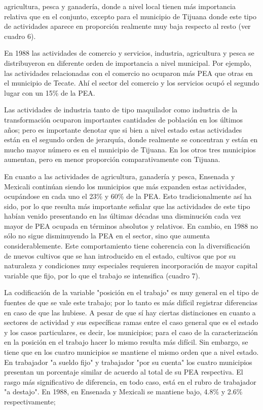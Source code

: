 \documentclass{article}
\begin{document}
agricultura, pesca y ganadería, donde a nivel local tienen más importancia relativa que en el conjunto, excepto para el municipio de Tijuana donde este tipo de actividades aparece en proporción realmente muy baja respecto al resto (ver cuadro 6).

En 1988 las actividades de comercio y servicios, industria, agricultura y pesca se distribuyeron en diferente orden de importancia a nivel municipal. Por ejemplo, las actividades relacionadas con el comercio no ocuparon más PEA que otras en el municipio de Tecate. Ahí el sector del comercio y los servicios ocupó el segundo lugar con un 15\% de la PEA.

Las actividades de industria tanto de tipo maquilador como industria de la transformación ocuparon importantes cantidades de población en los últimos años; pero es importante denotar que si bien a nivel estado estas actividades están en el segundo orden de jerarquía, donde realmente se concentran y están en mucho mayor número es en el municipio de Tijuana. En los otros tres municipios aumentan, pero en menor proporción comparativamente con Tijuana.

En cuanto a las actividades de agricultura, ganadería y pesca, Ensenada y Mexicali continúan siendo los municipios que más expanden estas actividades, ocupándose en cada uno el 23\% y 60\% de la PEA. Esto tradicionalmente así ha sido, por lo que resulta más importante sefialar que las actividades de este tipo habían venido presentando en las últimas décadas una disminución cada vez mayor de PEA ocupada en términos absolutos y relativos. En cambio, en 1988 no sólo no sigue disminuyendo la PEA en el sector, sino que aumenta considerablemente. Este comportamiento tiene coherencia con la diversificación de nuevos cultivos que se han introducido en el estado, cultivos que por su naturaleza y condiciones muy especiales requieren incorporación de mayor capital variable que fijo, por lo que el trabajo se intensifica (cuadro 7).

La codificación de la variable "posición en el trabajo" es muy general en el tipo de fuentes de que se vale este trabajo; por lo tanto es más difícil registrar diferencias en caso de que las hubiese. A pesar de que sí hay ciertas distinciones en cuanto a sectores de actividad y sus específicas ramas entre el caso general que es el estado y los casos particulares, es decir, los municipios; para el caso de la caracterización en la posición en el trabajo hacer lo mismo resulta más difícil. Sin embargo, se tiene que en los cuatro municipios se mantiene el mismo orden que a nivel estado. En trabajador "a sueldo fijo" y trabajador "por su cuenta" los cuatro municipios presentan un porcentaje similar de acuerdo al total de su PEA respectiva. El rasgo más significativo de diferencia, en todo caso, está en el rubro de trabajador "a destajo". En 1988, en Ensenada y Mexicali se mantiene bajo, 4.8\% y 2.6\% respectivamente;
\end{document}
